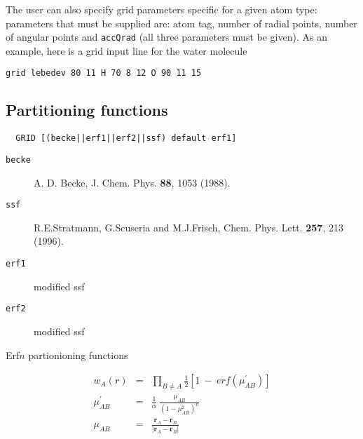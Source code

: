 The user can also specify grid parameters specific for a given atom type: 
parameters that must be supplied are: atom tag, number of radial points, number
of angular points and \verb+accQrad+ (all three parameters must be given).
As an example, here is a grid input line for the water molecule
\begin{verbatim}
grid lebedev 80 11 H 70 8 12 O 90 11 15 
\end{verbatim}

%


\clearpage
\subsection{Partitioning functions}

\begin{verbatim}
  GRID [(becke||erf1||erf2||ssf) default erf1]
\end{verbatim}


\begin{description}
\item[\tt becke]  A. D. Becke, J. Chem. Phys. {\bf 88}, 1053 (1988).
\item[\tt ssf] R.E.Stratmann, G.Scuseria and  M.J.Frisch,
Chem. Phys. Lett. {\bf 257}, 213 (1996).
\item[\tt erf1] modified ssf
\item[\tt erf2] modified ssf
\end{description}

Erf$n$ partionioning functions

\begin{eqnarray*}
 w_A(r) & = & \prod_{B\neq A}\frac{1}{2} \left[1 \ - \
erf(\mu^\prime_{AB})\right] \\
 \mu^\prime_{AB} & = & \frac{1}{\alpha} \ \frac{\mu_{AB}}{(1-\mu_{AB}^2)^n}\\
 \mu_{AB} & = & \frac{{\mathbf r}_A - {\mathbf r}_B}
{\left|{\mathbf r}_A - {\mathbf r}_B \right|}
\end{eqnarray*}




